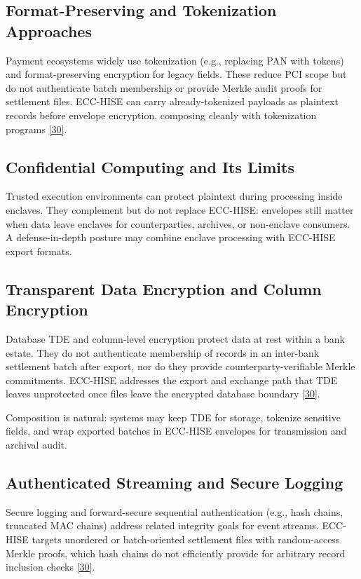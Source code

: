 \subsection{Format-Preserving and Tokenization Approaches}

\indent Payment ecosystems widely use tokenization (e.g., replacing PAN with tokens) and format-preserving encryption for legacy fields. These reduce PCI scope but do not authenticate batch membership or provide Merkle audit proofs for settlement files. ECC-HISE can carry already-tokenized payloads as plaintext records before envelope encryption, composing cleanly with tokenization programs \hyperref[ref:30]{[30]}.

\subsection{Confidential Computing and Its Limits}

\indent Trusted execution environments can protect plaintext during processing inside enclaves. They complement but do not replace ECC-HISE: envelopes still matter when data leave enclaves for counterparties, archives, or non-enclave consumers. A defense-in-depth posture may combine enclave processing with ECC-HISE export formats.

\subsection{Transparent Data Encryption and Column Encryption}

\indent Database TDE and column-level encryption protect data at rest within a bank estate. They do not authenticate membership of records in an inter-bank settlement batch after export, nor do they provide counterparty-verifiable Merkle commitments. ECC-HISE addresses the export and exchange path that TDE leaves unprotected once files leave the encrypted database boundary \hyperref[ref:30]{[30]}.

\indent Composition is natural: systems may keep TDE for storage, tokenize sensitive fields, and wrap exported batches in ECC-HISE envelopes for transmission and archival audit.

\subsection{Authenticated Streaming and Secure Logging}

\indent Secure logging and forward-secure sequential authentication (e.g., hash chains, truncated MAC chains) address related integrity goals for event streams. ECC-HISE targets unordered or batch-oriented settlement files with random-access Merkle proofs, which hash chains do not efficiently provide for arbitrary record inclusion checks \hyperref[ref:30]{[30]}.

